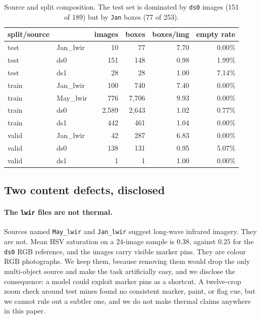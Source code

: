 \begin{table}[t]
\centering
\small
\caption{Source and split composition. The test set is dominated by
\texttt{ds0} images (151 of 189) but by \texttt{Jan} boxes (77 of 253).}
\label{tab:shift}
\begin{tabular}{llrrrr}
\toprule
split/source & & images & boxes & boxes/img & empty rate \\
\midrule
test & Jan\_lwir & 10 & 77 & 7.70 & 0.00\% \\
test & ds0 & 151 & 148 & 0.98 & 1.99\% \\
test & ds1 & 28 & 28 & 1.00 & 7.14\% \\
\midrule
train & Jan\_lwir & 100 & 740 & 7.40 & 0.00\% \\
train & May\_lwir & 776 & 7{,}706 & 9.93 & 0.00\% \\
train & ds0 & 2{,}589 & 2{,}643 & 1.02 & 0.77\% \\
train & ds1 & 442 & 461 & 1.04 & 0.00\% \\
\midrule
valid & Jan\_lwir & 42 & 287 & 6.83 & 0.00\% \\
valid & ds0 & 138 & 131 & 0.95 & 5.07\% \\
valid & ds1 & 1 & 1 & 1.00 & 0.00\% \\
\bottomrule
\end{tabular}
\end{table}

\subsection{Two content defects, disclosed}

\paragraph{The \texttt{lwir} files are not thermal.} Sources named
\texttt{May\_lwir} and \texttt{Jan\_lwir} suggest long-wave infrared imagery. They
are not. Mean HSV saturation on a $24$-image sample is $0.38$, against $0.25$ for
the \texttt{ds0} RGB reference, and the images carry visible marker pins. They are
colour RGB photographs. We keep them, because removing them would drop the only
multi-object source and make the task artificially easy, and we disclose the
consequence: a model could exploit marker pins as a shortcut. A twelve-crop zoom
check around test mines found no consistent marker, paint, or flag cue, but we
cannot rule out a subtler one, and we do not make thermal claims anywhere in this
paper.

